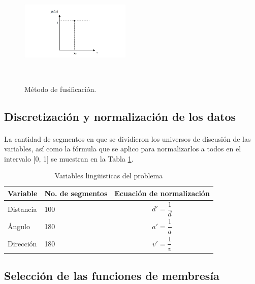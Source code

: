 \documentclass[a4paper,10pt]{article}
\begin{document}
\begin{figure}[htb]%
	\begin{center}		
		\includegraphics[width=200px, height=200px]{images/fuzzification.jpg}
	\end{center}
	\caption{Método de fusificación.\label{fig:fuzzification}}%
\end{figure}

\subsection{Discretización y normalización de los datos}\label{sub:discretization_and_normalization}
\paragraph{} La cantidad de segmentos en que se dividieron los universos de discusión de las variables, así como la fórmula que se aplico para
normalizarlos a todos en el intervalo [0, 1] se muestran en la Tabla \ref{tab:disc_norm}.

\begin{table}[htb]%
	\begin{center}
		 \begin{tabular}{| l | l | p{2.5cm} |}
			  \hline
			    Variable & No. de segmentos &  Ecuación de normalización \\ \hline
			    Distancia &  100 &  $$ d' = \frac{1}{d} $$ \\ \hline
			    Ángulo & 180 & $$ a' = \frac{1}{a} $$ \\ \hline
			    Dirección & 180 & $$ v' = \frac{1}{v} $$ \\ \hline
		  \end{tabular}		  
		  \caption{Variables lingüisticas del problema  \label{tab:disc_norm}}%
	\end{center}
\end{table}


\subsection{Selección de las funciones de membresía}\label{sub:membership_functions}
\end{document}
